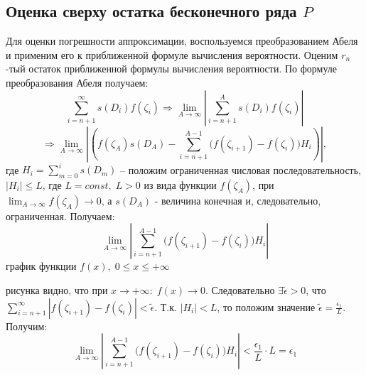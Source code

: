 	\subsection{Оценка сверху остатка бесконечного ряда $P$}
Для оценки погрешности аппроксимации, воспользуемся преобразованием Абеля и применим его к приближенной формуле вычисления вероятности.
Оценим $r_n$-тый остаток приближенной формулы вычисления вероятности. По формуле преобразования Абеля получаем:
$$\sum_{i=n+1}^{\infty}s(D_i)f(\zeta_{i})\Rightarrow \lim_{A \to \infty}\left|\sum_{i=n+1}^{A}s(D_i)f(\zeta_{i})\right|$$
$$\Rightarrow \lim_{A \to \infty}\left|(f(\zeta_A)s(D_A) - \sum_{i=n+1}^{A-1}\big(f(\zeta_{i+1})-f(\zeta_i)\big)H_i)\right|,$$где $H_i=\sum_{m=0}^i{s(D_m)}$ -- положим ограниченная числовая последовательность, $|H_i|\le L$, где $L=const,\;L>0$
 из вида функции $f(\zeta_A)$, при $\lim_{A \to \infty}f(\zeta_A)\rightarrow 0$, а $s(D_A)$ - величина конечная и, следовательно, ограниченная. Получаем:
$$\lim_{A\to\infty}\left|\sum_{i=n+1}^{A-1}{\big(f(\zeta_{i+1})-f(\zeta_i)\big)H_i}\right|$$
 график функции $f(x),\;0\le x\le+\infty$
\begin{figure}[h]
\end{figure}
 рисунка видно, что при $x\to+\infty:\;f(x)\to0$. Следовательно $\exists\tilde{\epsilon}>0$, что $\sum_{i=n+1}^\infty|f(\zeta_{i+1})-f(\zeta_i)|<\tilde{\epsilon}$. Т.к. $|H_i|<L$, то положим значение $\tilde{\epsilon}=\frac{\epsilon_1}{L}$. Получим:
$$\lim_{A\to\infty}\left|\sum_{i=n+1}^{A-1}{\big(f(\zeta_{i+1})-f(\zeta_i)\big)H_i}\right|<\frac{\epsilon_1}{L}\cdot L=\epsilon_1$$ 
